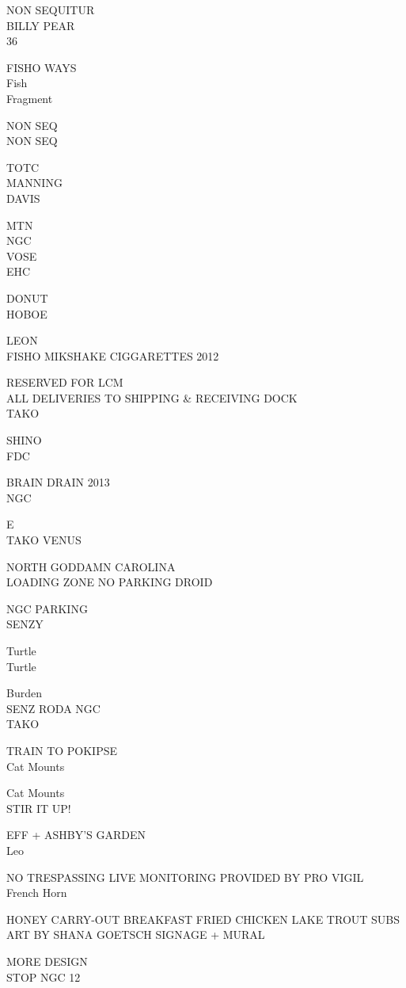 \documentclass[10pt,letterpaper]{article}
\begin{document}
NON SEQUITUR\\
BILLY PEAR\\
36

FISHO WAYS\\
Fish\\
Fragment

NON SEQ\\
NON SEQ

TOTC\\
MANNING\\
DAVIS

MTN\\
NGC\\
VOSE\\
EHC

DONUT\\
HOBOE

LEON\\
FISHO MIKSHAKE CIGGARETTES 2012

RESERVED FOR LCM\\
ALL DELIVERIES TO SHIPPING \& RECEIVING DOCK\\
TAKO

SHINO\\
FDC

BRAIN DRAIN 2013\\
NGC

E\\
TAKO VENUS

NORTH GODDAMN CAROLINA\\
LOADING ZONE NO PARKING DROID

NGC PARKING\\
SENZY

Turtle\\
Turtle

Burden\\
SENZ RODA NGC\\
TAKO

TRAIN TO POKIPSE\\
Cat Mounts

Cat Mounts\\
STIR IT UP!

EFF + ASHBY'S GARDEN\\
Leo

NO TRESPASSING LIVE MONITORING PROVIDED BY PRO VIGIL\\
French Horn

HONEY CARRY{-}OUT BREAKFAST FRIED CHICKEN LAKE TROUT SUBS\\
ART BY SHANA GOETSCH SIGNAGE + MURAL

MORE DESIGN\\
STOP NGC 12
\end{document}
